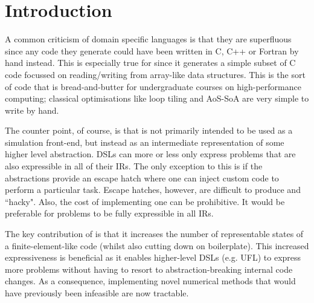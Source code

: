 \documentclass[thesis]{subfiles}
\begin{document}
\chapter{Introduction}
\label{chapter:introduction}

A common criticism of domain specific languages is that they are superfluous since any code they generate could have been written in C, C++ or Fortran by hand instead.
This is especially true for  since it generates a simple subset of C code focussed on reading/writing from array-like data structures.
This is the sort of code that is bread-and-butter for undergraduate courses on high-performance computing; classical optimisations like loop tiling and AoS-SoA are very simple to write by hand.

The counter point, of course, is that  is not primarily intended to be used as a simulation front-end, but instead as an intermediate representation of some higher level abstraction.
DSLs can more or less only express problems that are also expressible in all of their IRs.
The only exception to this is if the abstractions provide an escape hatch where one can inject custom code to perform a particular task.
Escape hatches, however, are difficult to produce and ``hacky".
Also, the cost of implementing one can be prohibitive.
It would be preferable for problems to be fully expressible in all IRs.

The key contribution of  is that it increases the number of representable states of a finite-element-like code (whilst also cutting down on boilerplate).
This increased expressiveness is beneficial as it enables higher-level DSLs (e.g. UFL) to express more problems without having to resort to abstraction-breaking internal code changes.
As a consequence, implementing novel numerical methods that would have previously been infeasible are now tractable.






\end{document}
